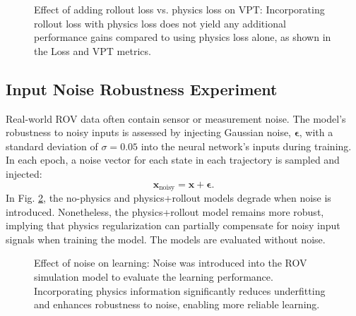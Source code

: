 \begin{figure}[!t]

    \caption{Effect of adding rollout loss vs. physics loss on VPT: Incorporating rollout loss with physics loss does not yield any additional performance gains compared to using physics loss alone, as shown in the Loss and VPT metrics.}
    \label{fig:rollout}
\end{figure}




\subsection{Input Noise Robustness Experiment}
\label{subsec:input_noise}
Real-world ROV data often contain sensor or measurement noise. The model’s robustness to noisy inputs is assessed by injecting Gaussian noise, $\bm{\epsilon}$, with a standard deviation of $\sigma = 0.05$ into the neural network's inputs during training.
In each epoch, a noise vector for each state in each trajectory is sampled and injected:
\begin{equation}
    \mathbf{x}_{\text{noisy}} = \mathbf{x} + \bm{\epsilon}.
\end{equation}
In Fig. \ref{fig:noise}, the no-physics and physics+rollout models degrade when noise is introduced. Nonetheless, the physics+rollout model remains more robust, implying that physics regularization can partially compensate for noisy input signals when training the model. The models are evaluated without noise.
%

\begin{figure}[!t]
    \centering
   
    \caption{Effect of noise on learning: Noise was introduced into the ROV simulation model to evaluate the learning performance. Incorporating physics information significantly reduces underfitting and enhances robustness to noise, enabling more reliable learning.}
    \label{fig:noise}
\end{figure}




